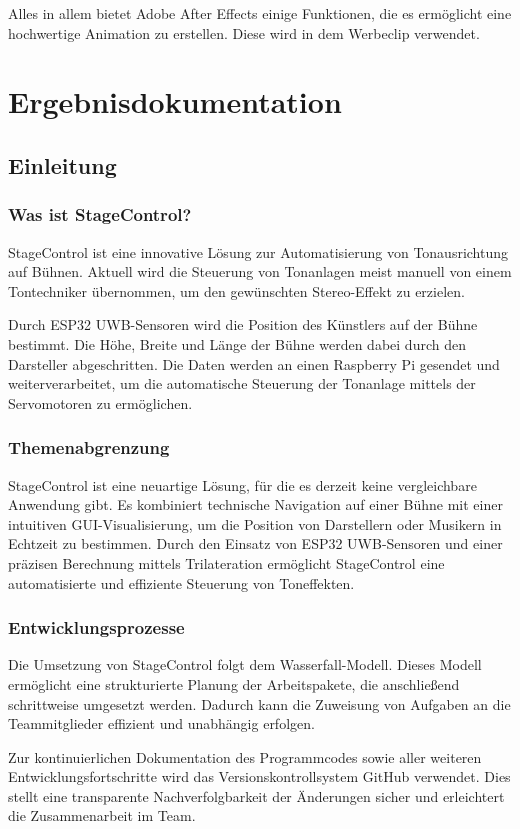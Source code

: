 Alles in allem bietet Adobe After Effects einige Funktionen, die es ermöglicht eine hochwertige Animation zu erstellen. Diese wird in dem Werbeclip verwendet. 

\chapter{Ergebnisdokumentation}
\section{Einleitung}
\subsection{Was ist StageControl?}
StageControl ist eine innovative Lösung zur Automatisierung von Tonausrichtung auf Bühnen. Aktuell wird die Steuerung von Tonanlagen meist manuell von einem Tontechniker übernommen, um den gewünschten Stereo-Effekt zu erzielen.

Durch ESP32 UWB-Sensoren wird die Position des Künstlers auf der Bühne bestimmt. Die Höhe, Breite und Länge der Bühne werden dabei durch den Darsteller abgeschritten. Die Daten werden an einen Raspberry Pi gesendet und weiterverarbeitet, um die automatische Steuerung der Tonanlage mittels der Servomotoren zu ermöglichen.

\subsection{Themenabgrenzung}
StageControl ist eine neuartige Lösung, für die es derzeit keine vergleichbare Anwendung gibt. Es kombiniert technische Navigation auf einer Bühne mit einer intuitiven GUI-Visualisierung, um die Position von Darstellern oder Musikern in Echtzeit zu bestimmen. Durch den Einsatz von ESP32 UWB-Sensoren und einer präzisen Berechnung mittels Trilateration ermöglicht StageControl eine automatisierte und effiziente Steuerung von Toneffekten.

\subsection{Entwicklungsprozesse}  
Die Umsetzung von StageControl folgt dem Wasserfall-Modell. Dieses Modell ermöglicht eine strukturierte Planung der Arbeitspakete, die anschließend schrittweise umgesetzt werden. Dadurch kann die Zuweisung von Aufgaben an die Teammitglieder effizient und unabhängig erfolgen.  

Zur kontinuierlichen Dokumentation des Programmcodes sowie aller weiteren Entwicklungsfortschritte wird das Versionskontrollsystem GitHub verwendet. Dies stellt eine transparente Nachverfolgbarkeit der Änderungen sicher und erleichtert die Zusammenarbeit im Team.


